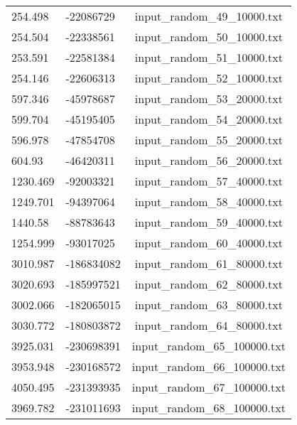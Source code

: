 \begin{longtable}[hb]{|l|l|c|}
    254.498 & -22086729 & input\_random\_49\_10000.txt \\
    254.504 & -22338561 & input\_random\_50\_10000.txt \\
    253.591 & -22581384 & input\_random\_51\_10000.txt \\
    254.146 & -22606313 & input\_random\_52\_10000.txt \\
    597.346 & -45978687 & input\_random\_53\_20000.txt \\
    599.704 & -45195405 & input\_random\_54\_20000.txt \\
    596.978 & -47854708 & input\_random\_55\_20000.txt \\
    604.93 & -46420311 & input\_random\_56\_20000.txt \\
    1230.469 & -92003321 & input\_random\_57\_40000.txt \\
    1249.701 & -94397064 & input\_random\_58\_40000.txt \\
    1440.58 & -88783643 & input\_random\_59\_40000.txt \\
    1254.999 & -93017025 & input\_random\_60\_40000.txt \\
    3010.987 & -186834082 & input\_random\_61\_80000.txt \\
    3020.693 & -185997521 & input\_random\_62\_80000.txt \\
    3002.066 & -182065015 & input\_random\_63\_80000.txt \\
    3030.772 & -180803872 & input\_random\_64\_80000.txt \\
    3925.031 & -230698391 & input\_random\_65\_100000.txt \\
    3953.948 & -230168572 & input\_random\_66\_100000.txt \\
    4050.495 & -231393935 & input\_random\_67\_100000.txt \\
    3969.782 & -231011693 & input\_random\_68\_100000.txt \\
    \hline
\end{longtable}